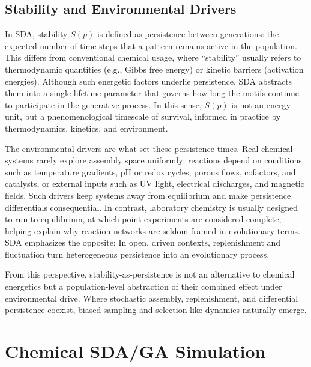 \documentclass[life,article,submit,pdftex,moreauthors]{Definitions/mdpi}
\begin{document}
\subsection{Stability and Environmental Drivers}

In SDA, stability $S(p)$ is defined as persistence between generations: the expected number of time steps that a pattern remains active in the population. This differs from conventional chemical usage, where “stability” usually refers to thermodynamic quantities (e.g., Gibbs free energy) or kinetic barriers (activation energies). Although such energetic factors underlie persistence, SDA abstracts them into a single lifetime parameter that governs how long the motifs continue to participate in the generative process. In this sense, $S(p)$ is not an energy unit, but a phenomenological timescale of survival, informed in practice by thermodynamics, kinetics, and environment.

The environmental drivers are what set these persistence times. Real chemical systems rarely explore assembly space uniformly: reactions depend on conditions such as temperature gradients, pH or redox cycles, porous flows, cofactors, and catalysts, or external inputs such as UV light, electrical discharges, and magnetic fields. Such drivers keep systems away from equilibrium and make persistence differentials consequential. In contrast, laboratory chemistry is usually designed to run to equilibrium, at which point experiments are considered complete, helping explain why reaction networks are seldom framed in evolutionary terms. SDA emphasizes the opposite: In open, driven contexts, replenishment and fluctuation turn heterogeneous persistence into an evolutionary process.  

From this perspective, stability-as-persistence is not an alternative to chemical energetics but a population-level abstraction of their combined effect under environmental drive. Where stochastic assembly, replenishment, and differential persistence coexist, biased sampling and selection-like dynamics naturally emerge.


\section{Chemical SDA/GA Simulation}
\end{document}
